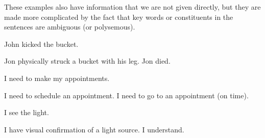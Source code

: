 \documentclass{wpblogentry}
\begin{document}
These examples also have information that we are not given directly, but they are made more complicated by the fact that key words or constituents in the sentences are ambiguous (or polysemous).
\begin{exe}
 \ex John kicked the bucket.
\begin{xlist}
    \ex Jon physically struck a bucket with his leg.
    \ex Jon died.
\end{xlist}

\ex I need to make my appointments.
\begin{xlist}
    \ex I need to schedule an appointment.
    \ex I need to go to an appointment (on time).
\end{xlist}

\ex I see the light.
\begin{xlist}
    \ex I have visual confirmation of a light source.
    \ex I understand.
\end{xlist}
\end{exe}
\end{document}
